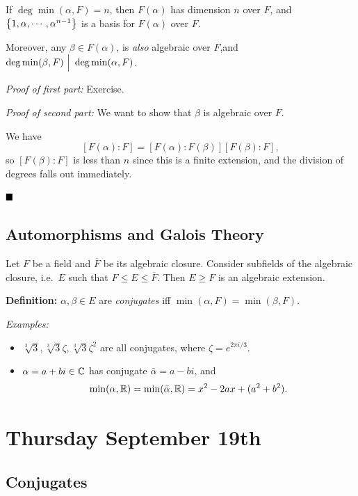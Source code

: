 If \(\deg\min(\alpha, F) = n\), then \(F(\alpha)\) has dimension \(n\)
over \(F\), and \(\left\{{1, \alpha, \cdots, \alpha^{n-1}}\right\}\) is a basis
for \(F(\alpha)\) over \(F\).

Moreover, any \(\beta \in F(\alpha)\), is \emph{also} algebraic over
\(F\),and \(\deg\min(\beta, F) {~\Bigm| ~} \deg \min(\alpha, F)\).

\emph{Proof of first part:} Exercise.

\emph{Proof of second part:} We want to show that \(\beta\) is algebraic
over \(F\).

We have \[
[F(\alpha):F] = [F(\alpha): F(\beta)][F(\beta): F]
,\] so \([F(\beta) : F]\) is less than \(n\) since this is a finite
extension, and the division of degrees falls out immediately.

\(\qed\)

\hypertarget{automorphisms-and-galois-theory}{%
\subsection{Automorphisms and Galois
Theory}\label{automorphisms-and-galois-theory}}

Let \(F\) be a field and \(\overline F\) be its algebraic closure.
Consider subfields of the algebraic closure, i.e.~\(E\) such that
\(F \leq E \leq \overline F\). Then \(E \geq F\) is an algebraic
extension.

\textbf{Definition:} \(\alpha, \beta \in E\) are \emph{conjugates} iff
\(\min(\alpha, F) = \min(\beta, F)\).

\emph{Examples:}

\begin{itemize}
\item
  \(\sqrt[3]{3}, \sqrt[3]{3}\zeta, \sqrt[3]{3}\zeta^2\) are all
  conjugates, where \(\zeta = e^{2\pi i/3}\).
\item
  \(\alpha = a+bi \in {\mathbb{C}}\) has conjugate \(\bar \alpha = a-bi\), and \[
  \min(\alpha, {\mathbb{R}}) = \min(\bar \alpha, {\mathbb{R}}) = x^2 - 2ax + (a^2 + b^2)
  .\]
\end{itemize}

\hypertarget{thursday-september-19th}{%
\section{Thursday September 19th}\label{thursday-september-19th}}

\hypertarget{conjugates}{%
\subsection{Conjugates}\label{conjugates}}

